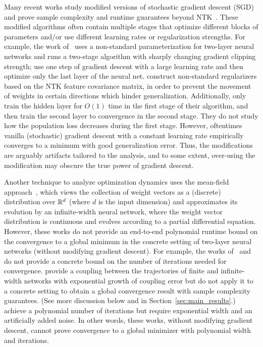 Many recent works study modified versions of stochastic gradient descent (SGD) and prove sample complexity and runtime guarantees beyond NTK~\citep{damian2022neural, abbe2022merged, mousavi2022neural, li2020learning, abbe2021staircase,allen2019learning,allen2019can, xu2023over, wu2023learning, daniely2020learning, allen2020backward, suzukibenefit, telgarsky2022feature, chen2020towards, nichani2022escapeNTK}. These modified algorithms often contain multiple stages that optimize different blocks of parameters and/or use different learning rates or regularization strengths. For example, the work of~\citet{li2020learning} uses a non-standard parameterization for two-layer neural networks and runs a two-stage algorithm with sharply changing gradient clipping strength; \citet{damian2022neural} use one step of gradient descent with a large learning rate and then optimize only the last layer of the neural net. \citet{nichani2022escapeNTK} construct non-standard regularizers based on the NTK feature covariance matrix, in order to prevent the movement of weights in certain directions which hinder generalization. Additionally, \citet{abbe2022merged} only train the hidden layer for $O(1)$ time in the first stage of their algorithm, and then train the second layer to convergence in the second stage. They do not study how the population loss decreases during the first stage. However, oftentimes vanilla (stochastic) gradient descent with a constant learning rate empirically converges to a minimum with good generalization error. Thus, the modifications are arguably artifacts tailored to the analysis, and to some extent, over-using the modification may obscure the true power of gradient descent.

Another technique to analyze optimization dynamics uses the mean-field approach~\citep{chizat2018global, mei2018mean, mei2019mean,sirignano2018mean, dou2021training,abbe2022merged, javanmard2020analysis,sirignano2020mean, wei2019regularization}, which views the collection of weight vectors as a (discrete) distribution over $\mathbb{R}^d$ (where $d$ is the input dimension) and approximates its evolution by an infinite-width neural network, where the weight vector distribution is continuous and evolves according to a partial differential equation. 
However, these works do not provide an end-to-end polynomial runtime bound on the convergence to a global minimum in the concrete setting of two-layer neural networks (without modifying gradient descent). For example, the works of~\citet{chizat2018global} and~\citet{mei2018mean} do not provide a concrete bound on the number of iterations needed for convergence. \citet{mei2019mean} provide a coupling between the trajectories of finite and infinite-width networks with exponential growth of coupling error but do not apply it to a concrete setting to obtain a global convergence result with sample complexity guarantees. (See more discussion below and in Section~\ref{sec:main_results}.) \citet{wei2019regularization} achieve a polynomial number of iterations but require exponential width and an artificially added noise. In other words, these works, without modifying gradient descent, cannot prove convergence to a global minimizer with polynomial width and iterations. 

